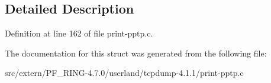 \subsection{Detailed Description}


Definition at line 162 of file print-\/pptp.c.



The documentation for this struct was generated from the following file:\begin{DoxyCompactItemize}
\item 
src/extern/PF\_\-RING-\/4.7.0/userland/tcpdump-\/4.1.1/print-\/pptp.c\end{DoxyCompactItemize}
